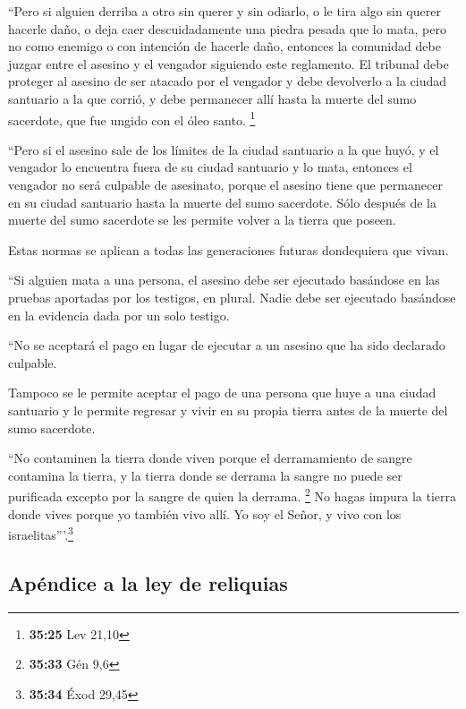  ``Pero si alguien derriba a otro sin querer y sin
odiarlo, o le tira algo sin querer hacerle daño,  o deja
caer descuidadamente una piedra pesada que lo mata, pero no como enemigo
o con intención de hacerle daño,  entonces la comunidad
debe juzgar entre el asesino y el vengador siguiendo este reglamento.
 El tribunal debe proteger al asesino de ser atacado por
el vengador y debe devolverlo a la ciudad santuario a la que corrió, y
debe permanecer allí hasta la muerte del sumo sacerdote, que fue ungido
con el óleo santo. \footnote{\textbf{35:25} Lev 21,10}

 ``Pero si el asesino sale de los límites de la ciudad
santuario a la que huyó,  y el vengador lo encuentra
fuera de su ciudad santuario y lo mata, entonces el vengador no será
culpable de asesinato,  porque el asesino tiene que
permanecer en su ciudad santuario hasta la muerte del sumo sacerdote.
Sólo después de la muerte del sumo sacerdote se les permite volver a la
tierra que poseen.

 Estas normas se aplican a todas las generaciones futuras
dondequiera que vivan.

 ``Si alguien mata a una persona, el asesino debe ser
ejecutado basándose en las pruebas aportadas por los testigos, en
plural. Nadie debe ser ejecutado basándose en la evidencia dada por un
solo testigo.

 ``No se aceptará el pago en lugar de ejecutar a un
asesino que ha sido declarado culpable.

 Tampoco se le permite aceptar el pago de una persona que
huye a una ciudad santuario y le permite regresar y vivir en su propia
tierra antes de la muerte del sumo sacerdote.

 ``No contaminen la tierra donde viven porque el
derramamiento de sangre contamina la tierra, y la tierra donde se
derrama la sangre no puede ser purificada excepto por la sangre de quien
la derrama. \footnote{\textbf{35:33} Gén 9,6}  No hagas
impura la tierra donde vives porque yo también vivo allí. Yo soy el
Señor, y vivo con los israelitas'''.\footnote{\textbf{35:34} Éxod 29,45}

\hypertarget{apuxe9ndice-a-la-ley-de-reliquias}{%
\subsection{Apéndice a la ley de
reliquias}\label{apuxe9ndice-a-la-ley-de-reliquias}}

